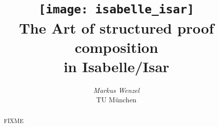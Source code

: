 \documentclass[12pt,a4paper,fleqn]{report}
\title{\texttt{[image: isabelle\_isar]}
  \\[4ex] The Art of structured proof composition \\ in Isabelle/Isar}
\author{\emph{Markus Wenzel} \\ TU M\"unchen}
\begin{document}
\underscoreoff

\maketitle

\begin{abstract}
  FIXME
\end{abstract}


 \tableofcontents \clearfirst



\begingroup
   \small\raggedright\frenchspacing
  
\endgroup

\nocite{Wenzel-PhD}
\end{document}
